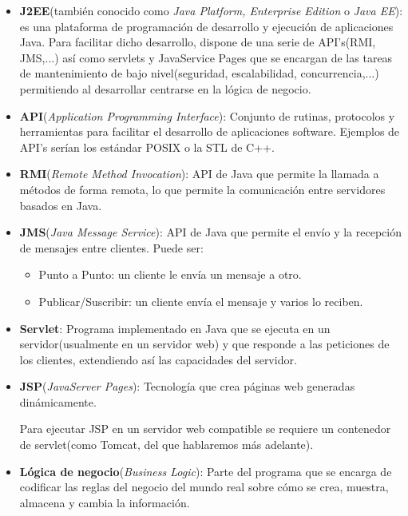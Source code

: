 \documentclass[a4paper, 10pt]{article}
\begin{document}
	\begin{itemize}
		\item \textbf{J2EE}(también conocido como \textit{Java Platform, Enterprise Edition} o \textit{Java EE}): es una plataforma de programación de desarrollo y ejecución de aplicaciones Java. Para facilitar dicho desarrollo, dispone de una serie de API's(RMI, JMS,...) así como servlets y JavaService Pages que se encargan de las tareas de mantenimiento de bajo nivel(seguridad, escalabilidad, concurrencia,...) permitiendo al desarrollar centrarse en la lógica de negocio.\cite{J2EE_Def}
		
		\item \textbf{API}(\textit{Application Programming Interface}): Conjunto de rutinas, protocolos y herramientas para facilitar el desarrollo de aplicaciones software. Ejemplos de API's serían los estándar POSIX o la STL de C++.\cite{API_Def}
		
		\item \textbf{RMI}(\textit{Remote Method Invocation}): API de Java que permite la llamada a métodos de forma remota, lo que permite la comunicación entre servidores basados en Java. \cite{RMI_Def}
		
		\item \textbf{JMS}(\textit{Java Message Service}): API de Java que permite el envío y la recepción de mensajes entre clientes. Puede ser:
		\begin{itemize}
			\item Punto a Punto: un cliente le envía un mensaje a otro.
			\item Publicar/Suscribir: un cliente envía el mensaje y varios lo reciben.
		\end{itemize}
		\cite{JMS_Def}

		\item \textbf{Servlet}: Programa implementado en Java que se ejecuta en un servidor(usualmente en un servidor web) y que responde a las peticiones de los clientes, extendiendo así las capacidades del servidor.\cite{Servlet_Def}
		
		\item \textbf{JSP}(\textit{JavaServer Pages}): Tecnología que crea páginas web generadas dinámicamente.\cite{JSP_Def}
		
		Para ejecutar JSP en un servidor web compatible se requiere un contenedor de servlet(como Tomcat, del que hablaremos más adelante).
		
		\item \textbf{Lógica de negocio}(\textit{Business Logic}): Parte del programa que se encarga de codificar las reglas del negocio del mundo real sobre cómo se crea, muestra, almacena y cambia la información.\cite{BL_Def}
		
	\end{itemize}
\end{document}
